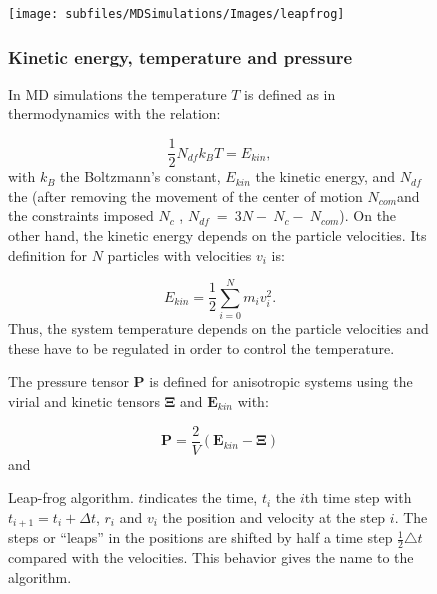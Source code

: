 \begin{center}
\begin{figure}[H]
\centering{}%
\begin{minipage}[t]{0.55\columnwidth}%
\begin{center}
\texttt{[image: subfiles/MDSimulations/Images/leapfrog]}
\par\end{center}
\protect\caption[Leap-frog algorithm.]{\label{fig:Leapfrogs}Leap-frog algorithm. $t$indicates the time,
$t_{i}$ the $i$th time step with $t_{i+1}=t_{i}+\Delta t$, $r_{i}$
and $v_{i}$ the position and velocity at the step $i$. The steps
or ``leaps'' in the positions are shifted by half a time step $\frac{1}{2}\triangle t$
compared with the velocities. This behavior gives the name to the
algorithm.}

\par

\subsubsection{Kinetic energy, temperature and pressure}

In MD simulations the temperature $T$ is defined as in thermodynamics
with the relation:

\begin{equation}
\frac{1}{2}N_{df}k_{B}T=E_{kin},\label{eq:Temp-KinEnergy-FreedomDeg}
\end{equation}
with $k_{B}$ the Boltzmann's constant, $E_{kin}$ the kinetic energy,
and $N_{df}$ the (after removing the movement of the center of motion $N_{com}$and
the constraints imposed $N_{c}$ , $N_{df}~=~3N-~N_{c}-~N_{com}$). On the other hand, the kinetic energy depends on the particle velocities. Its definition for $N$ particles with velocities $v_{i}$ is:

\begin{equation}
E_{kin}=\frac{1}{2}\sum_{i=0}^{N}m_{i}v_{i}^{2}.\label{eq:kinetic_Energy}
\end{equation}
Thus, the system temperature depends on the particle velocities and
these have to be regulated in order to control the temperature.

The pressure tensor $\mathbf{P}$ is defined for anisotropic systems
using the virial and kinetic tensors $\mathbf{\Xi}$ and $\mathbf{E}_{kin}$\cite{parker:1954}
with:

\begin{equation}
\mathbf{P}=\frac{2}{V}(\mathbf{E}_{kin}-\mathbf{\Xi})\label{eq:pressure-tensor}
\end{equation}
and


\end{minipage}
\end{figure}
\end{center}
